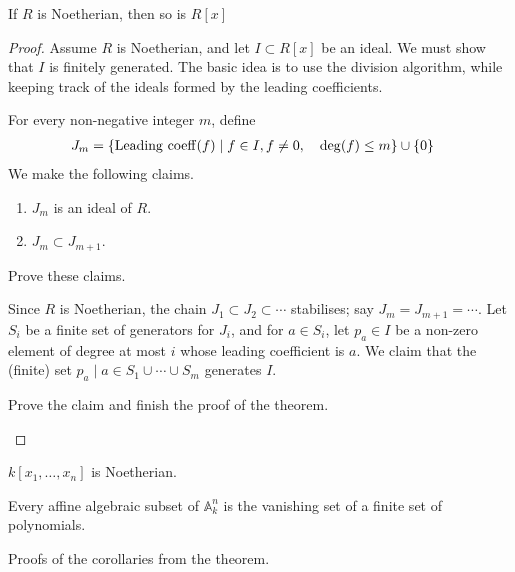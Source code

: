 \documentclass[11pt]{article}
\begin{document}
\begin{theorem}
If \(R\) is Noetherian, then so is \(R[x]\)
\end{theorem}
\begin{proof}
Assume \(R\) is Noetherian, and let \(I \subset R[x]\) be an ideal.
We must show that \(I\) is finitely generated.
The basic idea is to use the division algorithm, while keeping track of the ideals formed by the leading coefficients.

For every non-negative integer \(m\), define
\begin{align*}
J_m &= \{{\rm Leading\ coeff} (f) \mid f \in I, f \neq 0, \quad \deg(f) \leq m\} \cup \{0\}
\end{align*}
We make the following claims.
\begin{enumerate}
\item \(J_m\) is an ideal of \(R\).
\item \(J_m \subset J_{m+1}\).
\end{enumerate}
\begin{skipped}
Prove these claims.
\end{skipped}
Since \(R\) is Noetherian, the chain \(J_1 \subset J_2 \subset \cdots\) stabilises; say \(J_m = J_{m+1} = \cdots\).
Let \(S_i\) be a finite set of generators for \(J_i\), and for \(a \in S_i\), let \(p_a \in I\) be a non-zero element of degree at most \(i\) whose leading coefficient is \(a\).
We claim that the (finite) set \(p_a \mid a \in S_1 \cup \cdots \cup S_m\) generates \(I\).    
\begin{skipped}
Prove the claim and finish the proof of the theorem.
\end{skipped}
\end{proof}
\begin{corollary}
\(k[x_1,\dots,x_n]\) is Noetherian.
\end{corollary}
\begin{corollary}
Every affine algebraic subset of \(\mathbb A^n_k\) is the vanishing set of a finite set of polynomials.
\end{corollary}
\begin{skipped}
Proofs of the corollaries from the theorem.
\end{skipped}
\end{document}
